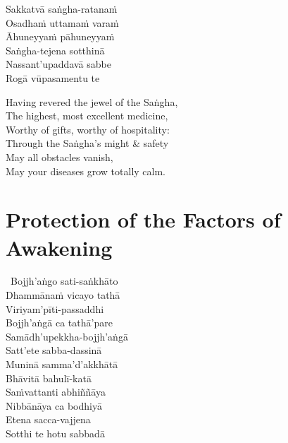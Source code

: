 \begin{pali-hang-continued}
  Sakkatvā saṅgha-ratanaṁ\\
  Osadhaṁ uttamaṁ varaṁ\\
  Āhuneyyaṁ pāhuneyyaṁ\\
  Saṅgha-tejena sotthinā\\
  Nassant'upaddavā sabbe\\
  Rogā vūpasamentu te
\end{pali-hang-continued}

 \ifninebythirteen\vspace{-0.1cm}\enlargethispage{1\baselineskip}\fi

\begin{english-verses}
  Having revered the jewel of the Saṅgha,\\
  The highest, most excellent medicine,\\
  Worthy of gifts, worthy of hospitality:\\
  Through the Saṅgha's might \& safety\\
  May all obstacles vanish,\\
  May your diseases grow totally calm.
\end{english-verses}

\ifninebythirteen \vspace{-0.35cm} \suttaRef{[MJG]} \else \suttaRef{[MJG]} \fi



\section{Protection of the Factors of Awakening}
\label{protection-of-factors-of-awakening}

\begin{pali-hang-together}
  \anglebracketleft\ \hspace{-0.5mm}Bojjh'aṅgo sati-saṅkhāto \hspace{-0.5mm}\anglebracketright\ \\
  Dhammānaṁ vicayo tathā\\
  Viriyam'pīti-passaddhi\\
  Bojjh'aṅgā ca tathā'pare\\
  Samādh'upekkha-bojjh'aṅgā\\
  Satt'ete sabba-dassinā\\
  Muninā samma'd'akkhātā\\
  Bhāvitā bahulī-katā\\
  Saṁvattanti abhiññāya\\
  Nibbānāya ca bodhiyā\\
  Etena sacca-vajjena\\
  Sotthi te hotu sabbadā
\end{pali-hang-together}

